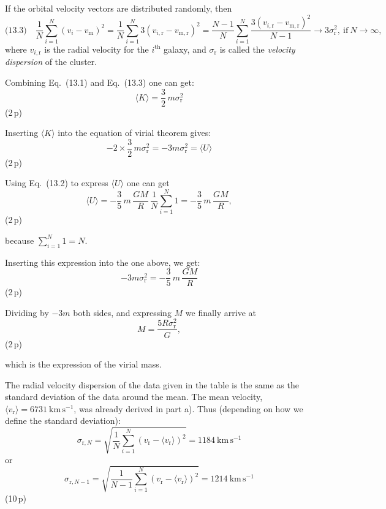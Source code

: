 \begin{description}
  If the orbital velocity vectors are distributed randomly, then
  \[ \text{(13.3)}\quad
     \frac{1}{N}\sum_{i=1}^{N}(v_i - v_{\mathrm{m}})^2
     = \frac{1}{N}\sum_{i=1}^{N} 3(v_{i,\mathrm{r}} - v_{\mathrm{m,r}})^2
     = \frac{N-1}{N}\sum_{i=1}^{N}
       \frac{3(v_{i,\mathrm{r}} - v_{\mathrm{m,r}})^2}{N-1}
     \to 3\sigma_{\mathrm{r}}^2,\ \text{if}\ N\to\infty, \]
  where $v_{i,\mathrm{r}}$ is the radial velocity for the
  $i^{\mathrm{th}}$ galaxy, and $\sigma_{\mathrm{r}}$ is called the
  \emph{velocity dispersion} of the cluster.

  Combining Eq.~(13.1) and Eq.~(13.3) one can get:
  \[ \langle K\rangle = \frac{3}{2}\,m\sigma_{\mathrm{r}}^2 \]
  \hfill(2\,p)

  Inserting $\langle K\rangle$ into the equation of virial theorem gives:
  \[ -2\times\frac{3}{2}\,m\sigma_{\mathrm{r}}^2
     = -3m\sigma_{\mathrm{r}}^2 = \langle U\rangle \]
  \hfill(2\,p)

  Using Eq.~(13.2) to express $\langle U\rangle$ one can get
  \[ \langle U\rangle
     = -\frac{3}{5}\,m\,\frac{GM}{R}\,\frac{1}{N}\sum_{i=1}^{N} 1
     = -\frac{3}{5}\,m\,\frac{GM}{R}, \]
  \hfill(2\,p)

  because $\sum_{i=1}^{N} 1 = N$.

  Inserting this expression into the one above, we get:
  \[ -3m\sigma_{\mathrm{r}}^2 = -\frac{3}{5}\,m\,\frac{GM}{R} \]
  \hfill(2\,p)

  Dividing by $-3m$ both sides, and expressing $M$ we finally arrive at
  \[ M = \frac{5R\sigma_{\mathrm{r}}^2}{G}, \]
  \hfill(2\,p)

  which is the expression of the virial mass.

\item[d)] The radial velocity dispersion of the data given in the table is
  the same as the standard deviation of the data around the mean. The mean
  velocity, $\langle v_{\mathrm{r}}\rangle = 6731\ \mathrm{km\,s^{-1}}$,
  was already derived in part a). Thus (depending on how we define the
  standard deviation):
  \[ \sigma_{\mathrm{r},N}
     = \sqrt{\frac{1}{N}\sum_{i=1}^{N}
       \left(v_{\mathrm{r}} - \langle v_{\mathrm{r}}\rangle\right)^2}
     = 1184\ \mathrm{km\,s^{-1}} \]
  or
  \[ \sigma_{\mathrm{r},N-1}
     = \sqrt{\frac{1}{N-1}\sum_{i=1}^{N}
       \left(v_{\mathrm{r}} - \langle v_{\mathrm{r}}\rangle\right)^2}
     = 1214\ \mathrm{km\,s^{-1}} \]
  \hfill(10\,p)


\end{description}
